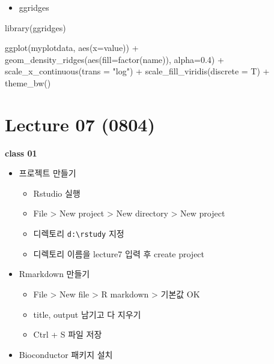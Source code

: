 \documentclass[
]{book}
\newenvironment{Shaded}{\begin{snugshade}}{\end{snugshade}}
\newcommand{\AttributeTok}[1]{\textcolor[rgb]{0.77,0.63,0.00}{#1}}
\newcommand{\FloatTok}[1]{\textcolor[rgb]{0.00,0.00,0.81}{#1}}
\newcommand{\FunctionTok}[1]{\textcolor[rgb]{0.00,0.00,0.00}{#1}}
\newcommand{\NormalTok}[1]{#1}
\newcommand{\SpecialCharTok}[1]{\textcolor[rgb]{0.00,0.00,0.00}{#1}}
\newcommand{\StringTok}[1]{\textcolor[rgb]{0.31,0.60,0.02}{#1}}
\providecommand{\tightlist}{%
  \setlength{\itemsep}{0pt}\setlength{\parskip}{0pt}}
\begin{document}
\begin{itemize}
\tightlist
\item
  ggridges
\end{itemize}

\begin{Shaded}
\begin{Highlighting}[]
\FunctionTok{library}\NormalTok{(ggridges)}

\FunctionTok{ggplot}\NormalTok{(myplotdata, }\FunctionTok{aes}\NormalTok{(}\AttributeTok{x=}\NormalTok{value)) }\SpecialCharTok{+}
  \FunctionTok{geom\_density\_ridges}\NormalTok{(}\FunctionTok{aes}\NormalTok{(}\AttributeTok{fill=}\FunctionTok{factor}\NormalTok{(name)), }\AttributeTok{alpha=}\FloatTok{0.4}\NormalTok{) }\SpecialCharTok{+}
  \FunctionTok{scale\_x\_continuous}\NormalTok{(}\AttributeTok{trans =} \StringTok{"log"}\NormalTok{) }\SpecialCharTok{+}
  \FunctionTok{scale\_fill\_viridis}\NormalTok{(}\AttributeTok{discrete =}\NormalTok{ T) }\SpecialCharTok{+}
  \FunctionTok{theme\_bw}\NormalTok{()}
\end{Highlighting}
\end{Shaded}

\hypertarget{lecture-07-0804}{%
\section{Lecture 07 (0804)}\label{lecture-07-0804}}

\textbf{class 01}

\begin{itemize}
\tightlist
\item
  프로젝트 만들기

  \begin{itemize}
  \tightlist
  \item
    Rstudio 실행
  \item
    File \textgreater{} New project \textgreater{} New directory \textgreater{} New project
  \item
    디렉토리 \texttt{d:\textbackslash{}rstudy} 지정
  \item
    디렉토리 이름을 lecture7 입력 후 create project
  \end{itemize}
\item
  Rmarkdown 만들기

  \begin{itemize}
  \tightlist
  \item
    File \textgreater{} New file \textgreater{} R markdown \textgreater{} 기본값 OK
  \item
    title, output 남기고 다 지우기
  \item
    Ctrl + S 파일 저장
  \end{itemize}
\item
  Bioconductor 패키지 설치
\end{itemize}
\end{document}
